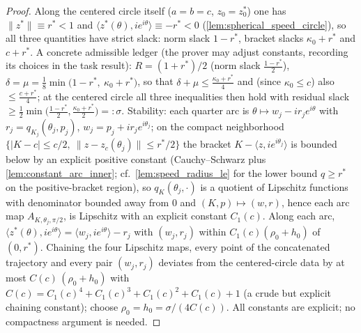 \begin{proof}
  \leanok
  Along the centered circle itself ($a=b=c$, $z_0=z_0^\ast$) one has
  $\|z^\ast\|\equiv r^\ast<1$ and $\langle z^\ast(\theta),ie^{i\theta}\rangle\equiv
  -r^\ast<0$ (\cref{lem:spherical_speed_circle}), so all three quantities have strict
  slack: norm slack $1-r^\ast$, bracket slacks $\kappa_0+r^\ast$ and $c+r^\ast$. A
  concrete admissible ledger (the prover may adjust constants, recording its choices
  in the task result): $R=(1+r^\ast)/2$ (norm slack $\tfrac{1-r^\ast}{2}$),
  $\delta=\mu=\tfrac18\min\bigl(1-r^\ast,\ \kappa_0+r^\ast\bigr)$, so that
  $\delta+\mu\le\tfrac{\kappa_0+r^\ast}{4}$ and (since $\kappa_0\le c$) also
  $\le\tfrac{c+r^\ast}{4}$; at the centered circle all three inequalities then hold
  with residual slack $\ge\tfrac12\min\bigl(\tfrac{1-r^\ast}{2},
  \tfrac{\kappa_0+r^\ast}{2}\bigr)=:\sigma$. Stability: each quarter arc is
  $\theta\mapsto w_j-i r_j e^{i\theta}$ with $r_j=q_{K_j}(\theta_j,p_j)$,
  $w_j=p_j+i r_j e^{i\theta_j}$; on the compact neighborhood
  $\{|K-c|\le c/2,\ \|z-z_c(\theta_j)\|\le r^\ast/2\}$ the bracket
  $K-\langle z,ie^{i\theta_j}\rangle$ is bounded below by an explicit positive
  constant (Cauchy–Schwarz plus \cref{lem:constant_arc_inner}; cf.\
  \cref{lem:speed_radius_le} for the lower bound $q\ge r^\ast$ on the
  positive-bracket region), so $q_K(\theta_j,\cdot)$ is a quotient of Lipschitz
  functions with denominator bounded away from $0$ and $(K,p)\mapsto(w,r)$, hence each
  arc map $A_{K,\theta_j,\pi/2}$, is Lipschitz with an explicit constant $C_1(c)$.
  Along each arc,
  $\langle z^\ast(\theta),ie^{i\theta}\rangle=\langle w_j,ie^{i\theta}\rangle-r_j$
  with $(w_j,r_j)$ within $C_1(c)(\rho_0+h_0)$ of $(0,r^\ast)$. Chaining the four
  Lipschitz maps, every point of the concatenated trajectory and every pair
  $(w_j,r_j)$ deviates from the centered-circle data by at most
  $C(c)\,(\rho_0+h_0)$ with $C(c)=C_1(c)^4+C_1(c)^3+C_1(c)^2+C_1(c)+1$ (a crude but
  explicit chaining constant); choose $\rho_0=h_0=\sigma/(4C(c))$. All constants are
  explicit; no compactness argument is needed.
\end{proof}

